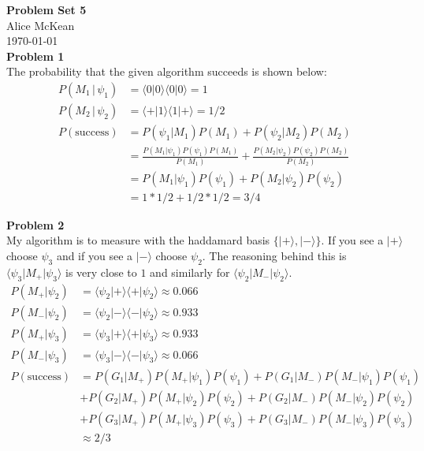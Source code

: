\documentclass[fleqn]{article}
\newcommand{\problem}[1]{{\large\textbf{Problem #1}}}
\newcommand{\bra}[1]{\ensuremath{\langle #1 |}}
\newcommand{\ket}[1]{\ensuremath{| #1 \rangle}}
\newcommand{\innerF}[2]{\ensuremath{\langle #1 | #2 \rangle}}
\begin{document}
\noindent\Large\textbf{Problem Set 5} \\
\normalsize
Alice McKean \\
\today \\

\problem{1} \\
The probability that the given algorithm succeeds is shown below:
\vspace{-0.5em}
\begin{align*}
  P(M_1 \, | \, \psi_1) &= \innerF{0}{0}\innerF{0}{0} = 1 \\
  P(M_2 \, | \, \psi_2) &= \innerF{+}{1}\innerF{1}{+} = 1/2 \\
  P(\text{success}) &= P(\psi_1 | M_1) P(M_1) + P(\psi_2 | M_2) P(M_2) \\
  &= \frac{P(M_1 | \psi_1) P(\psi_1) P(M_1)}{P(M_1)} + \frac{P(M_2 | \psi_2)P(\psi_2)P(M_2)}{P(M_2)} \\
  &= P(M_1 | \psi_1) P(\psi_1) + P(M_2 | \psi_2) P(\psi_2) \\
  &= 1 * 1/2 + 1/2 * 1/2 = 3/4
\end{align*}

\problem{2} \\
My algorithm is to measure with the haddamard basis $\{ \ket{+} , \ket{-} \}$.
If you see a $\ket{+}$ choose $\psi_3$ and if you see a $\ket{-}$ choose $\psi_2$.
The reasoning behind this is
$\bra{\psi_3}M_{+}\ket{\psi_3}$ is very close to $1$ and similarly for $\bra{\psi_2}M_{-}\ket{\psi_2}$.
\begin{align*}
  P(M_+ | \psi_2) &= \innerF{\psi_2}{+}\innerF{+}{\psi_2} \approx 0.066 \\ 
  P(M_- | \psi_2) &= \innerF{\psi_2}{-}\innerF{-}{\psi_2} \approx 0.933 \\ 
  P(M_+ | \psi_3) &= \innerF{\psi_3}{+}\innerF{+}{\psi_3} \approx 0.933 \\ 
  P(M_- | \psi_3) &= \innerF{\psi_3}{-}\innerF{-}{\psi_3} \approx 0.066 \\ 
  P(\text{success}) &= P(G_1 | M_{+})P(M_{+} | \psi_1)P(\psi_1) + P(G_1 | M_{-})P(M_{-} | \psi_1)P(\psi_1) \\
                    &+ P(G_2 | M_{+})P(M_{+} | \psi_2)P(\psi_2) + P(G_2 | M_{-})P(M_{-} | \psi_2)P(\psi_2) \\
                    &+ P(G_3 | M_{+})P(M_{+} | \psi_3)P(\psi_3) + P(G_3 | M_{-})P(M_{-} | \psi_3)P(\psi_3) \\
                    &\approx 2/3 
\end{align*}
\end{document}
